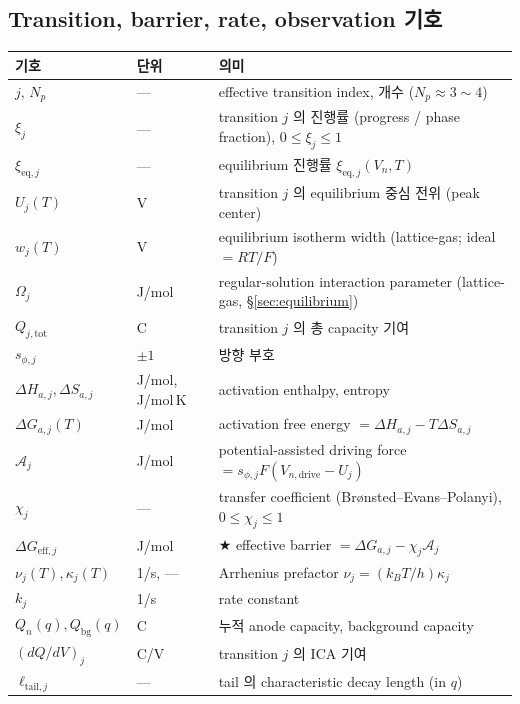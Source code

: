\documentclass[11pt,a4paper]{article}
\newcommand{\eff}{\mathrm{eff}}
\newcommand{\eq}{\mathrm{eq}}
\newcommand{\dimedrive}{\mathrm{drive}}
\newcommand{\tot}{\mathrm{tot}}
\newcommand{\bg}{\mathrm{bg}}
\begin{document}
\subsection{Transition, barrier, rate, observation 기호}\label{sec:notation_rest}
\begin{longtable}{p{} p{} p{}}
\toprule 기호 & 단위 & 의미 \\ \midrule \endhead
$j,\,N_p$ & --- & effective transition index, 개수 ($N_p\approx3\sim4$) \\
$\xi_j$ & --- & transition $j$ 의 진행률 (progress / phase fraction), $0\le\xi_j\le1$ \\
$\xi_{\eq,j}$ & --- & equilibrium 진행률 $\xi_{\eq,j}(V_n,T)$ \\
$U_j(T)$ & V & transition $j$ 의 equilibrium 중심 전위 (peak center) \\
$w_j(T)$ & V & equilibrium isotherm width (lattice-gas; ideal $=RT/F$) \\
$\Omega_j$ & J/mol & regular-solution interaction parameter (lattice-gas, \S\ref{sec:equilibrium}) \\
$Q_{j,\tot}$ & C & transition $j$ 의 총 capacity 기여 \\
$s_{\phi,j}$ & $\pm1$ & 방향 부호 \\
$\Delta H_{a,j},\Delta S_{a,j}$ & J/mol, J/mol\,K & activation enthalpy, entropy \\
$\Delta G_{a,j}(T)$ & J/mol & activation free energy $=\Delta H_{a,j}-T\Delta S_{a,j}$ \\
$\mathcal A_j$ & J/mol & potential-assisted driving force $=s_{\phi,j}F(V_{n,\dimedrive}-U_j)$ \\
$\chi_j$ & --- & transfer coefficient (Brønsted--Evans--Polanyi), $0\le\chi_j\le1$ \\
$\Delta G_{\eff,j}$ & J/mol & ★ effective barrier $=\Delta G_{a,j}-\chi_j\mathcal A_j$ \\
$\nu_j(T),\kappa_j(T)$ & 1/s, --- & Arrhenius prefactor $\nu_j=(k_BT/h)\kappa_j$ \\
$k_j$ & 1/s & rate constant \\
$Q_n(q),Q_\bg(q)$ & C & 누적 anode capacity, background capacity \\
$(dQ/dV)_j$ & C/V & transition $j$ 의 ICA 기여 \\
$\ell_{\mathrm{tail},j}$ & --- & tail 의 characteristic decay length (in $q$) \\
\bottomrule
\end{longtable}
\end{document}
